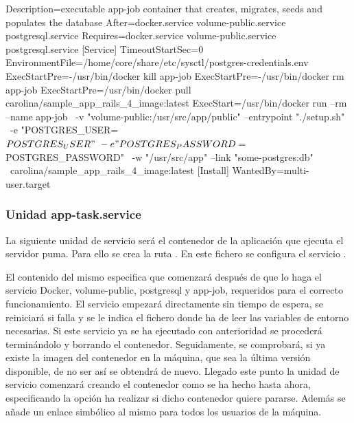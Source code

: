 \begin{codelisting}
\label{code:app-job.service}
\begin{code}
[Unit] 
  Description=executable app-job container that creates, migrates, seeds and 
              populates the database
  After=docker.service volume-public.service postgresql.service
  Requires=docker.service volume-public.service postgresql.service
[Service] 
  TimeoutStartSec=0 
  EnvironmentFile=/home/core/share/etc/sysctl/postgres-credentials.env
  ExecStartPre=-/usr/bin/docker kill app-job 
  ExecStartPre=-/usr/bin/docker rm app-job 
  ExecStartPre=/usr/bin/docker pull carolina/sample_app_rails_4_image:latest 
  ExecStart=/usr/bin/docker run --rm --name app-job \
  -v "volume-public:/usr/src/app/public" --entrypoint "./setup.sh" \
  -e "POSTGRES_USER=${POSTGRES_USER}" \
  -e "POSTGRES_PASSWORD=${POSTGRES_PASSWORD}" \
  -w "/usr/src/app" --link "some-postgres:db" \
  carolina/sample_app_rails_4_image:latest
[Install] 
  WantedBy=multi-user.target
\end{code}
\end{codelisting}

\subsubsection{Unidad app-task.service}

La siguiente unidad de servicio será el contenedor de la aplicación que ejecuta el servidor puma. Para ello se crea la ruta . En este fichero se configura el servicio .

El contenido del mismo especifica que comenzará después de que lo haga el servicio Docker, volume-public, postgresql y app-job, requeridos para el correcto funcionamiento. El servicio empezará directamente sin tiempo de espera, se reiniciará si falla y se le indica el fichero donde ha de leer las variables de entorno necesarias. Si este servicio ya se ha ejecutado con anterioridad se procederá terminándolo y borrando el contenedor. Seguidamente, se comprobará, si ya existe la imagen del contenedor en la máquina, que sea la última versión disponible, de no ser así se obtendrá de nuevo. Llegado este punto la unidad de servicio comenzará creando el contenedor como se ha hecho hasta ahora, especificando la opción ha realizar si dicho contenedor quiere pararse. Además se añade un enlace simbólico al mismo para todos los usuarios de la máquina. 

